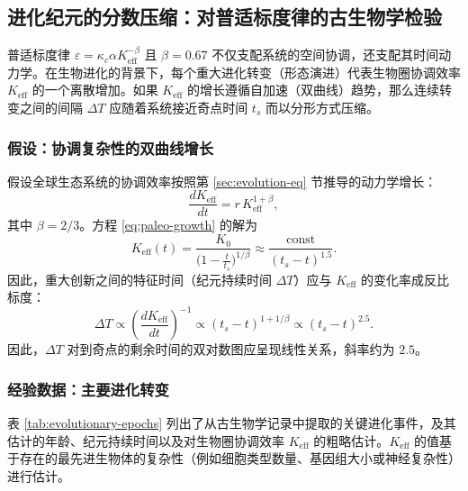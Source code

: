 \documentclass[12pt,a4paper]{article}
\theoremstyle{remark}
\newcommand{\Keff}{K_{\mathrm{eff}}}
\begin{document}
	\subsection{进化纪元的分数压缩：对普适标度律的古生物学检验}
	\label{subsec:paleo-scaling}
	
	普适标度律 $\varepsilon = \kappa_c \alpha K_{\mathrm{eff}}^{-\beta}$ 且 $\beta = 0.67$ 不仅支配系统的空间协调，还支配其时间动力学。在生物进化的背景下，每个重大进化转变（形态演进）代表生物圈协调效率 $K_{\mathrm{eff}}$ 的一个离散增加。如果 $K_{\mathrm{eff}}$ 的增长遵循自加速（双曲线）趋势，那么连续转变之间的间隔 $\Delta T$ 应随着系统接近奇点时间 $t_s$ 而以分形方式压缩。
	
	\subsubsection{假设：协调复杂性的双曲线增长}
	
	假设全球生态系统的协调效率按照第 \ref{sec:evolution-eq} 节推导的动力学增长：
	\begin{equation}
		\frac{dK_{\mathrm{eff}}}{dt} = r \, K_{\mathrm{eff}}^{1+\beta},
		\label{eq:paleo-growth}
	\end{equation}
	其中 $\beta = 2/3$。方程 \eqref{eq:paleo-growth} 的解为
	\begin{equation}
		K_{\mathrm{eff}}(t) = \frac{K_0}{\bigl(1 - \frac{t}{t_s}\bigr)^{1/\beta}} \approx \frac{\text{const}}{(t_s - t)^{1.5}}.
		\label{eq:paleo-keff}
	\end{equation}
	因此，重大创新之间的特征时间（纪元持续时间 $\Delta T$）应与 $K_{\mathrm{eff}}$ 的变化率成反比标度：
	\begin{equation}
		\Delta T \propto \left( \frac{dK_{\mathrm{eff}}}{dt} \right)^{-1} \propto (t_s - t)^{1 + 1/\beta} \propto (t_s - t)^{2.5}.
		\label{eq:paleo-dT}
	\end{equation}
	因此，$\Delta T$ 对到奇点的剩余时间的双对数图应呈现线性关系，斜率约为 $2.5$。
	
	\subsubsection{经验数据：主要进化转变}
	
	表 \ref{tab:evolutionary-epochs} 列出了从古生物学记录中提取的关键进化事件，及其估计的年龄、纪元持续时间以及对生物圈协调效率 $\Keff$ 的粗略估计。$\Keff$ 的值基于存在的最先进生物体的复杂性（例如细胞类型数量、基因组大小或神经复杂性）进行估计。
		
\end{document}
